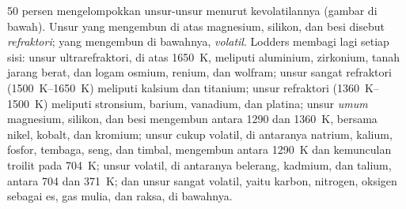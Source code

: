  50 persen mengelompokkan unsur-unsur menurut kevolatilannya
(gambar di bawah). Unsur yang mengembun di atas magnesium, silikon, dan
besi disebut \emph{refraktori}; yang mengembun di bawahnya, \emph{volatil}.
Lodders membagi lagi setiap sisi: unsur ultrarefraktori, di atas
\qty{1650}{K}, meliputi aluminium, zirkonium, tanah jarang berat, dan
logam osmium, renium, dan wolfram; unsur sangat refraktori
(\qtyrange{1500}{1650}{K}) meliputi kalsium dan titanium; unsur refraktori
(\qtyrange{1360}{1500}{K}) meliputi stronsium, barium, vanadium, dan platina; unsur
\emph{umum}
magnesium, silikon, dan besi mengembun antara \num{1290} dan
\qty{1360}{K}, bersama nikel, kobalt, dan kromium; unsur cukup
volatil, di antaranya natrium, kalium, fosfor, tembaga, seng, dan
timbal, mengembun antara \qty{1290}{K} dan kemunculan troilit pada
\qty{704}{K}; unsur volatil, di antaranya belerang, kadmium, dan talium,
antara \num{704} dan \qty{371}{K}; dan unsur sangat volatil, yaitu karbon,
nitrogen, oksigen sebagai es, gas mulia, dan raksa, di bawahnya.

